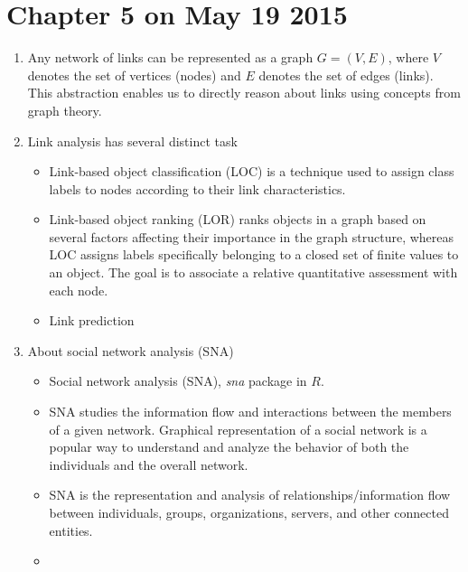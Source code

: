 \documentclass[14pt]{article}
\begin{document}
\section{Chapter 5 on May 19 2015}
\begin{enumerate}
 \item Any network of links can be represented as a graph $G=(V,E)$, where $V$ denotes the set of vertices (nodes) and $E$ denotes the set of edges (links). This abstraction enables us to directly reason about links using concepts from graph theory.
 
 \item Link analysis has several distinct task
  \begin{itemize}
   \item Link-based object classification (LOC) is a technique used to assign class labels to nodes according to their link characteristics. 
   \item Link-based object ranking (LOR) ranks objects in a graph based on several factors affecting their importance in the graph structure, whereas LOC assigns labels specifically belonging to a closed set of finite values to an object. The goal is to associate a relative quantitative assessment with each node. 
   \item Link prediction
  \end{itemize}
 
 \item About social network analysis (SNA)
  \begin{itemize}
   \item Social network analysis (SNA), \emph{sna} package in $R$.
   \item SNA studies the information flow and interactions between the members of a given network. Graphical representation of a social network is a popular way to understand and analyze the behavior of both the individuals and the overall network.
   \item SNA is the representation and analysis of relationships/information flow between individuals, groups, organizations, servers, and other connected entities.
   \item  
  \end{itemize}
  

\end{enumerate}
\end{document}
